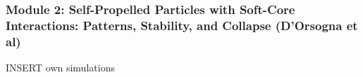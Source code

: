 \documentclass[compress]{beamer}
\begin{document}
\begin{frame}
  \frametitle{Module 2: Self-Propelled Particles with Soft-Core Interactions: Patterns, Stability, and Collapse (D'Orsogna et al)}
	
	
	INSERT own simulations 
%	
	
\end{frame}

%	
%	
%	
%


%	
%	
%
\end{document}
